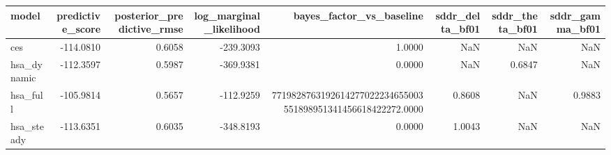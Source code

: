 \begin{tabular}{lrrrrrrr}
\toprule
model & predictive\_score & posterior\_predictive\_rmse & log\_marginal\_likelihood & bayes\_factor\_vs\_baseline & sddr\_delta\_bf01 & sddr\_theta\_bf01 & sddr\_gamma\_bf01 \\
\midrule
ces & -114.0810 & 0.6058 & -239.3093 & 1.0000 & NaN & NaN & NaN \\
hsa\_dynamic & -112.3597 & 0.5987 & -369.9381 & 0.0000 & NaN & 0.6847 & NaN \\
hsa\_full & -105.9814 & 0.5657 & -112.9259 & 7719828763192614277022234655003551898951341456618422272.0000 & 0.8608 & NaN & 0.9883 \\
hsa\_steady & -113.6351 & 0.6035 & -348.8193 & 0.0000 & 1.0043 & NaN & NaN \\
\bottomrule
\end{tabular}
